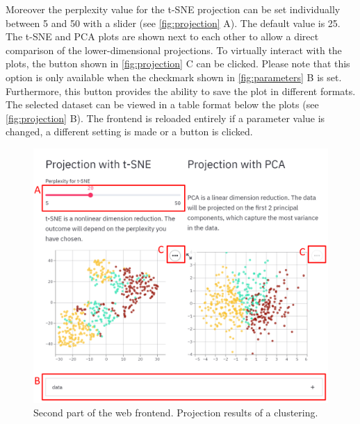 Moreover the perplexity value for the t-SNE projection can be set individually between 5 and 50 with a slider (see \autoref{fig:projection} A). The default value is 25. The t-SNE and PCA plots are shown next to each other to allow a direct comparison of the lower-dimensional projections. To virtually interact with the plots, the button shown in \autoref{fig:projection} C can be clicked. Please note that this option is only available when the checkmark shown in \autoref{fig:parameters} B is set. Furthermore, this button provides the ability to save the plot in different formats.
The selected dataset can be viewed in a table format below the plots (see \autoref{fig:projection} B).
The frontend is reloaded entirely if a parameter value is changed, a different setting is made or a button is clicked. 
\begin{figure}[H]
	\centering
	\includegraphics[width=\linewidth]{modules/web_frontend/projection_letters}
	\caption{Second part of the web frontend. Projection results of a clustering.}\label{fig:projection}
\end{figure}

